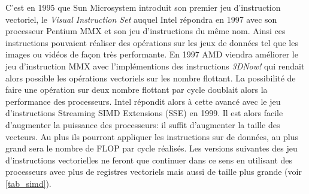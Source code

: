  
 C'est en 1995 que Sun Microsystem introduit son premier jeu d'instruction vectoriel, le \textit{Visual Instruction Set} auquel Intel répondra en 1997 avec son processeur Pentium MMX et son jeu d'instructions du même nom. Ainsi ces instructions pouvaient réaliser des opérations sur les jeux de données tel que les images ou vidéos de façon très performante. En 1997 AMD viendra améliorer le jeu d'instruction MMX avec l'implémentions des instructions \textit{3DNow!} qui rendait alors possible les opérations vectoriels sur les nombre flottant. La possibilité de faire une opération sur deux nombre flottant par cycle doublait alors la performance des processeurs. Intel répondit alors à cette avancé avec le jeu d'instructions Streaming SIMD Extensions (SSE) en 1999. Il est alors facile d'augmenter la puissance des processeurs: il suffit d'augmenter la taille des vecteurs. Au plus ils pourront appliquer les instructions sur de données, au plus grand sera le nombre de FLOP par cycle réalisés. Les versions suivantes des jeu d'instructions vectorielles ne feront que continuer dans ce sens en utilisant des processeurs avec plus de registres vectoriels mais aussi de taille plus grande (voir \ref{tab_simd}).
 
 
 

